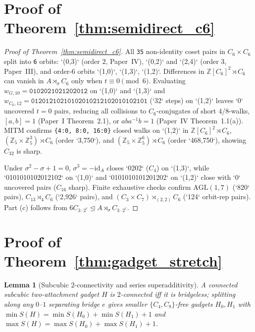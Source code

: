 \documentclass[11pt]{amsart}
\newtheorem{lemma}[theorem]{Lemma}
\theoremstyle{remark}
\newcommand{\Z}{\mathbb{Z}}
\newcommand{\id}{\mathrm{id}}
\begin{document}
\section{Proof of Theorem~\ref{thm:semidirect_c6}}

\begin{proof}[Proof of Theorem~\ref{thm:semidirect_c6}]
All \texttt{35} non-identity coset pairs in $C_6 \times C_6$ split into \texttt{6} orbits: `(0,3)` (order $2$, Paper~IV), `(0,2)` and `(2,4)` (order $3$, Paper~III), and order-$6$ orbits `(1,0)`, `(1,3)`, `(1,2)`. Differences in $\Z[C_6]^2 \rtimes C_6$ can vanish in $A \rtimes_\sigma C_6$ only when $t \equiv 0 \pmod 6$. Evaluating $w_{G,10} = \mathtt{0102021021202012}$ on `(1,0)` and `(1,3)` and $w_{C_6,12} = \mathtt{01201210210102010212102010102101}$ (`32` steps) on `(1,2)` leaves `0` uncovered $t = 0$ pairs, reducing all collisions to $C_6$-conjugates of short $4$/$8$-walks, $[a, b] = 1$ (Paper~I Theorem~2.1), or $a b a^{-1} b = 1$ (Paper~IV Theorem~1.1(a)). MITM confirms \texttt{\{4:0, 8:0, 16:0\}} closed walks on `(1,2)` in $\Z[C_6]^2 \rtimes C_6$, $(\Z_5 \times \Z_5^3) \rtimes C_6$ (order `3,750`), and $(\Z_5 \times \Z_5^6) \rtimes C_6$ (order `468,750`), showing $C_{32}$ is sharp.

Under $\sigma^2 - \sigma + 1 = 0$, $\sigma^3 = -\id_A$ closes `0202` ($C_4$) on `(1,3)`, while `0101010102012102` on `(1,0)` and `0101010101201202` on `(1,2)` close with `0` uncovered pairs ($C_{16}$ sharp). Finite exhaustive checks confirm $\mathrm{AGL}(1,7)$ (`820` pairs), $C_{13} \rtimes_4 C_6$ (`2,926` pairs), and $(C_3 \times C_7) \rtimes_{(2,2)} C_6$ (`124` orbit-rep pairs). Part (c) follows from $6 C_{3 \cdot 2^r} \trianglelefteq A \rtimes_\sigma C_{3 \cdot 2^r}$.
\end{proof}

\section{Proof of Theorem~\ref{thm:gadget_stretch}}

\begin{lemma}[Subcubic $2$-connectivity and series superadditivity]\label{lem:series}
A connected subcubic two-attachment gadget $H$ is $2$-connected iff it is bridgeless; splitting along any $0$--$1$ separating bridge $e$ gives smaller $\{C_4, C_8\}$-free gadgets $H_0, H_1$ with $\min S(H) = \min S(H_0) + \min S(H_1) + 1$ and $\max S(H) = \max S(H_0) + \max S(H_1) + 1$.
\end{lemma}
\end{document}
